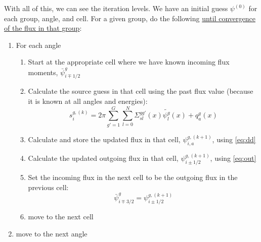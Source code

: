 \documentclass[12pt]{article}
\begin{document}
With all of this, we can see the iteration levels. We have an initial guess $\psi^{(0)}$ for each group, angle, and cell. For a given group, do the following \underline{until convergence of the flux in that group}:
\begin{enumerate}
\item For each angle
    \begin{enumerate}
    \item Start at the appropriate cell where we have known incoming flux moments, $\bar{\psi}_{i\mp1/2}^{g}$
    \item Calculate the source guess in that cell using the past flux value (because it is known at all angles and energies):
    \[
    s_{i}^{g,(k)} = 2\pi \sum_{g'=1}^G
  \sum_{l=0}^N \Sigma_{sl}^{gg'}(x) \tilde{\psi^g_l}(x) + q_{a}^g(x)
    \]
    \item Calculate and store the updated flux in that cell, $\psi_{i,a}^{g,(k+1)}$, using \autoref{eq:dd} 
    \item Calculate the updated outgoing flux in that cell, $\psi_{i\pm1/2}^{g,(k+1)}$, using \autoref{eq:out}
    \item Set the incoming flux in the next cell to be the outgoing flux in the previous cell:
    \[
    \bar{\psi}_{i\mp3/2}^{g} = \psi_{i\pm1/2}^{g,(k+1)}
    \]
    \item move to the next cell
  \end{enumerate}
  \item move to the next angle
\end{enumerate}
\end{document}
